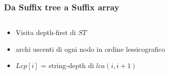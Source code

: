 \begin{frame}[fragile]
\frametitle{Da Suffix tree a Suffix array}
\begin{columns}
\begin{column}{0.5\textwidth}
\begin{itemize}
\item
Visita depth-first di $ST$
\item
archi uscenti di ogni nodo in ordine lessicografico
\item
$Lcp[i]$ = string-depth di $lca(i,i+1)$
\end{itemize}
\end{column}
\begin{column}{0.4\textwidth}
\begin{center}
\end{center}
\end{column}
\end{columns}
\end{frame}

